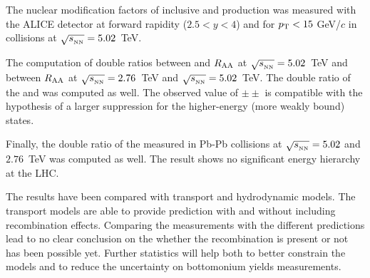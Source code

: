 The nuclear modification factors of inclusive \upsis and \upsiss production was measured with the ALICE detector at forward rapidity ($2.5<y<4$) and for $p_{\rm T}<15$ GeV/$c$ in \pbpb collisions at $\sqrt{s_{_{\rm NN}}}=5.02$~\rm{TeV}.

The computation of double ratios between \upsis and \upsiss $\mbox{$R_{\rm{AA}}$}$ at $\sqrt{s_{_{\rm NN}}}=5.02$~\rm{TeV} and between \upsis $\mbox{$R_{\rm{AA}}$}$ at $\sqrt{s_{_{\rm NN}}}=2.76$~\rm{TeV} and $\sqrt{s_{_{\rm NN}}}=5.02$~\rm{TeV}.
The double ratio of the \upsis and \upsiss \raa was computed as well. 
The observed value of $ \pm \pm $ is compatible with the hypothesis of a larger suppression for the higher-energy (more weakly bound) states.

Finally, the double ratio of the \upsi \raa measured in Pb-Pb collisions at $\sqrt{s_{_{\rm NN}}}=5.02$ and $2.76$~\rm{TeV} was computed as well. 
The result shows no significant energy hierarchy at the LHC.


The results have been compared with transport and hydrodynamic models.
The transport models are able to provide prediction with and without including recombination effects.
Comparing the measurements with the different predictions lead to no clear conclusion on the whether the recombination is present or not has been possible yet.
Further statistics will help both to better constrain the models and to reduce the uncertainty on bottomonium yields measurements.
